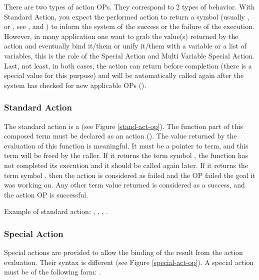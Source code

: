 There are two types of action OPs. They correspond to 2 types of behavior.
With Standard Action, you expect the performed action to return a symbol
(usually ,  or , see ,
and ) to inform the system of the success or the
failure of the execution. However, in many application one want to grab the
value(s) returned by the action and eventually bind it/them or unify it/them
with a variable or a list of variables, this is the role of the Special Action
and Multi Variable Special Action. Last, not least, in both cases, the action
can return before completion (there is a special value  for this
purpose) and will be automatically called again after the system has checked
for new applicable OPs ().



\subsubsection{Standard Action}


The standard action is a  (see Figure
\ref{stand-act-op}).  The function part of this composed term must be
declared as an action (). The value
returned by the evaluation of this function is meaningful. It must be a
pointer to term, and this term will be freed by the caller. If it returns
the term symbol , the function has not completed its execution
and it should be called again later.  If it returns the term symbol
, then the action is considered as failed and the OP failed the
goal it was working on. Any other term value returned is considered as a
success, and the action OP is successful.

Example of standard action: , , , .

\subsubsection{Special Action}

Special actions are provided to allow the binding of the result from the
action evaluation. Their syntax is different (see Figure
\ref{special-act-op}). A special action must be of the following form: \*
.

